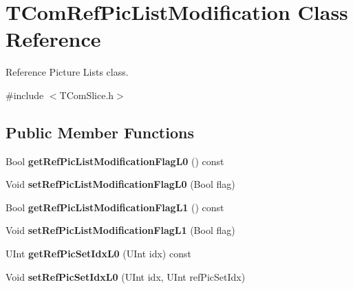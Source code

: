 \hypertarget{class_t_com_ref_pic_list_modification}{}\section{T\+Com\+Ref\+Pic\+List\+Modification Class Reference}
\label{class_t_com_ref_pic_list_modification}


Reference Picture Lists class.  




{\ttfamily \#include $<$T\+Com\+Slice.\+h$>$}

\subsection*{Public Member Functions}
\begin{DoxyCompactItemize}
\item 
\mbox{\label{class_t_com_ref_pic_list_modification_af00e4ef1ff1eb014bc523535dfe22b09}} 
Bool {\bfseries get\+Ref\+Pic\+List\+Modification\+Flag\+L0} () const
\item 
\mbox{\label{class_t_com_ref_pic_list_modification_acfd3ab4d99bbd5db007d92dbe8b9e4d8}} 
Void {\bfseries set\+Ref\+Pic\+List\+Modification\+Flag\+L0} (Bool flag)
\item 
\mbox{\label{class_t_com_ref_pic_list_modification_a0a60b98d698a0590ab89a19e6afd0dce}} 
Bool {\bfseries get\+Ref\+Pic\+List\+Modification\+Flag\+L1} () const
\item 
\mbox{\label{class_t_com_ref_pic_list_modification_a68b1f9ceb60a53f254902d9163681911}} 
Void {\bfseries set\+Ref\+Pic\+List\+Modification\+Flag\+L1} (Bool flag)
\item 
\mbox{\label{class_t_com_ref_pic_list_modification_a02d6223ce29e91cbe095416ebbe3601c}} 
U\+Int {\bfseries get\+Ref\+Pic\+Set\+Idx\+L0} (U\+Int idx) const
\item 
\mbox{\label{class_t_com_ref_pic_list_modification_a28d723ba60f5ce9aa592f86ca494c5b6}} 
Void {\bfseries set\+Ref\+Pic\+Set\+Idx\+L0} (U\+Int idx, U\+Int ref\+Pic\+Set\+Idx)

\end{DoxyCompactItemize}
